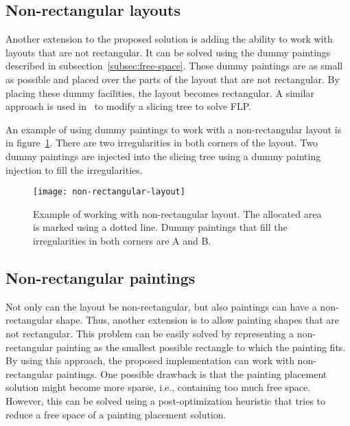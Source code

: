 \subsection{Non-rectangular layouts}\label{subsec:non-rectangular-layouts}

Another extension to the proposed solution is adding the ability to work with layouts that are not rectangular.
It can be solved using the dummy paintings described in subsection~\ref{subsec:free-space}.
These dummy paintings are as small as possible and placed over the parts of the layout that are not rectangular.
By placing these dummy facilities, the layout becomes rectangular.
A similar approach is used in~\cite{scholzExtensionsSTaTSPractical2010} to modify a slicing tree to solve FLP.

An example of using dummy paintings to work with a non-rectangular layout is in figure~\ref{fig:non-rectangular-layout}.
There are two irregularities in both corners of the layout.
Two dummy paintings are injected into the slicing tree using a dummy painting injection to fill the irregularities.

\begin{figure}[h!]
    \texttt{[image: non-rectangular-layout]}
    \caption[Example of working with non-rectangular layout.]{Example of working with non-rectangular layout. The allocated area is marked using a dotted line.
    Dummy paintings that fill the irregularities in both corners are A and B.}
    \label{fig:non-rectangular-layout}
\end{figure}

\subsection{Non-rectangular paintings}\label{subsec:non-rectangular-paintings}

Not only can the layout be non-rectangular, but also paintings can have a non-rectangular shape.
Thus, another extension is to allow painting shapes that are not rectangular.
This problem can be easily solved by representing a non-rectangular painting
as the smallest possible rectangle to which the painting fits.
By using this approach, the proposed implementation can work with non-rectangular paintings.
One possible drawback is that the painting placement solution might become more sparse,
i.e., containing too much free space.
However, this can be solved using a post-optimization heuristic that tries to reduce a free space
of a painting placement solution.


